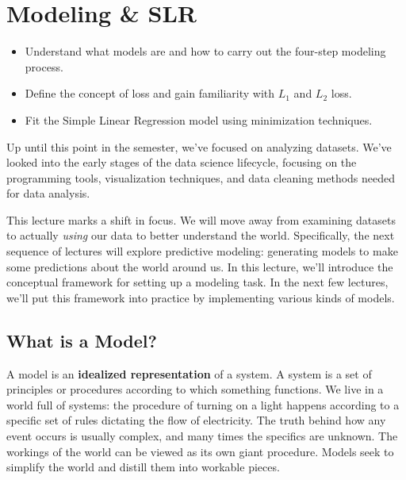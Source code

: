 \documentclass[
  letterpaper,
  DIV=11,
  numbers=noendperiod]{scrreprt}
\providecommand{\tightlist}{%
  \setlength{\itemsep}{0pt}\setlength{\parskip}{0pt}}\usepackage{longtable,booktabs,array}
\begin{document}

\chapter{Modeling \& SLR}\label{modeling-slr}

\begin{tcolorbox}[enhanced jigsaw, arc=.35mm, left=2mm, toprule=.15mm, leftrule=.75mm, bottomrule=.15mm, colframe=quarto-callout-note-color-frame, rightrule=.15mm, colbacktitle=quarto-callout-note-color!10!white, opacitybacktitle=0.6, coltitle=black, bottomtitle=1mm, colback=white, toptitle=1mm, title=\textcolor{quarto-callout-note-color}{\faInfo}\hspace{0.5em}{Learning Outcomes}, breakable, opacityback=0, titlerule=0mm]

\begin{itemize}
\tightlist
\item
  Understand what models are and how to carry out the four-step modeling
  process.
\item
  Define the concept of loss and gain familiarity with \(L_1\) and
  \(L_2\) loss.
\item
  Fit the Simple Linear Regression model using minimization techniques.
\end{itemize}

\end{tcolorbox}

Up until this point in the semester, we've focused on analyzing
datasets. We've looked into the early stages of the data science
lifecycle, focusing on the programming tools, visualization techniques,
and data cleaning methods needed for data analysis.

This lecture marks a shift in focus. We will move away from examining
datasets to actually \emph{using} our data to better understand the
world. Specifically, the next sequence of lectures will explore
predictive modeling: generating models to make some predictions about
the world around us. In this lecture, we'll introduce the conceptual
framework for setting up a modeling task. In the next few lectures,
we'll put this framework into practice by implementing various kinds of
models.

\section{What is a Model?}\label{what-is-a-model}

A model is an \textbf{idealized representation} of a system. A system is
a set of principles or procedures according to which something
functions. We live in a world full of systems: the procedure of turning
on a light happens according to a specific set of rules dictating the
flow of electricity. The truth behind how any event occurs is usually
complex, and many times the specifics are unknown. The workings of the
world can be viewed as its own giant procedure. Models seek to simplify
the world and distill them into workable pieces.
\end{document}
